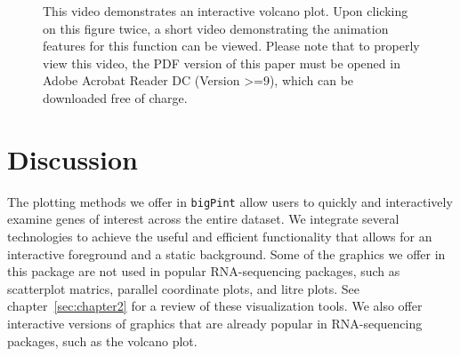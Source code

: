 \documentclass[11pt,a4paper,oldfontcommands,openany]{memoir}
\numberwithin{equation}{section} %
\newcommand{\pkg}[1]{{\texttt{#1}}}
\begin{document}
\begin{figure}[H]
    \begin{framed}
    \centering
    \end{framed}
    \caption{This video demonstrates an interactive volcano plot. Upon clicking on this figure twice, a short video demonstrating the animation features for this function can be viewed. Please note that to properly view this video, the PDF version of this paper must be opened in Adobe Acrobat Reader DC (Version >=9), which can be downloaded free of charge.}
    \label{fig:volcano}
\end{figure}

\section{Discussion}

The plotting methods we offer in \pkg{bigPint} allow users to quickly and interactively examine genes of interest across the entire dataset. We integrate several technologies to achieve the useful and efficient functionality that allows for an interactive foreground and a static background. Some of the graphics we offer in this package are not used in popular RNA-sequencing packages, such as scatterplot matrics, parallel coordinate plots, and litre plots. See chapter~\ref{sec:chapter2} for a review of these visualization tools. We also offer interactive versions of graphics that are already popular in RNA-sequencing packages, such as the volcano plot.
\end{document}
